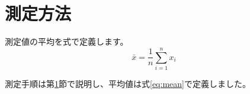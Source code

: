 \documentclass[dvipdfmx]{jlreq}
\begin{document}
\section{測定方法}
\label{sec:measurement}

測定値の平均を式で定義します。
\begin{equation}
  \bar{x} = \frac{1}{n}\sum_{i=1}^{n} x_i
  \label{eq:mean}
\end{equation}

測定手順は第\ref{sec:measurement}節で説明し、平均値は式\ref{eq:mean}で定義しました。
\end{document}
